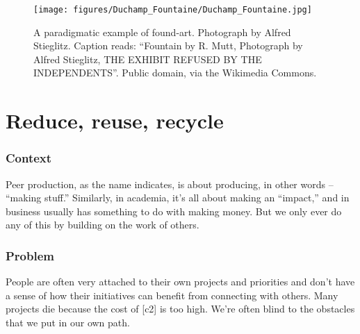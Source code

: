 

\begin{wrapfigure}{l}{.42\textwidth}
\vspace{-.1cm}
\begin{center}
\texttt{[image: figures/Duchamp\_Fountaine/Duchamp\_Fountaine.jpg]}
\end{center}
\caption{A paradigmatic example of found-art. Photograph by Alfred Stieglitz. Caption reads: ``Fountain by R. Mutt, Photograph by Alfred Stieglitz, THE EXHIBIT REFUSED BY THE INDEPENDENTS''. Public domain, via the Wikimedia Commons.\label{fountain}}
\vspace{-.8cm}
\end{wrapfigure}

\section{Reduce, reuse, recycle} \label{sec:Use_or_make}

\subsubsection*{Context}
Peer production, as the name indicates, is about producing, in other words -- ``making stuff.''  Similarly, in academia, it's all about making an ``impact,'' and in business usually has something to do with making money.  But we only ever do any of this by building on the work of others.    

\subsubsection*{Problem}
People are often very attached to their own projects and priorities and don't have a sense of how their initiatives can benefit from connecting with others. Many projects die because the cost of  [c2] is too high.  We're often blind to the obstacles that we put in our own path.

